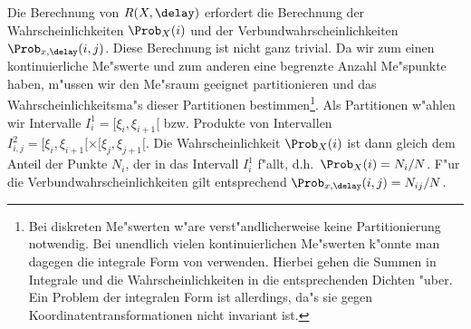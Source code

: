 Die Berechnung von $R(X,\delay)$ erfordert die Berechnung der Wahrscheinlichkeiten
$\Prob_X(i)$ und der Verbundwahrscheinlichkeiten $\Prob_{x,\delay}(i,j)$. Diese Berechnung
ist nicht ganz trivial. Da wir zum einen kontinuierliche Me"swerte und zum anderen eine
begrenzte Anzahl Me"spunkte haben, m"ussen wir den Me"sraum geeignet partitionieren und
das Wahrscheinlichkeitsma"s dieser Partitionen bestimmen\footnote{Bei diskreten Me"swerten
  w"are verst"andlicherweise keine Partitionierung notwendig. Bei unendlich vielen
  kontinuierlichen Me"swerten k"onnte man dagegen die integrale Form von
   verwenden. Hierbei gehen die Summen in Integrale und die
  Wahrscheinlichkeiten in die entsprechenden Dichten "uber. Ein Problem der integralen
  Form ist allerdings, da"s sie gegen Koordinatentransformationen nicht invariant ist.}.
Als Partitionen w"ahlen wir Intervalle $I^1_i=[\xi_i,\xi_{i+1}[$ bzw. Produkte von
Intervallen $I^2_{i,j}=[\xi_i,\xi_{i+1}[\times[\xi_j,\xi_{j+1}[$. Die Wahrscheinlichkeit
$\Prob_X(i)$ ist dann gleich dem Anteil der Punkte $N_i$, der in das Intervall $I^1_i$
f"allt, d.h.\ $\Prob_X(i)=N_i/N$. F"ur die Verbundwahrscheinlichkeiten gilt entsprechend
$\Prob_{x,\delay}(i,j)=N_{ij}/N$.


